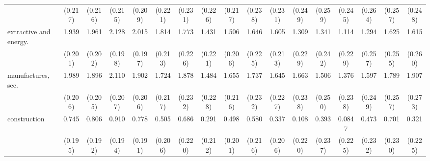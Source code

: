 {\begin{tabular}{l*{16}{c}}
                    &     (0.217)         &     (0.216)         &     (0.215)         &     (0.209)         &     (0.221)         &     (0.231)         &     (0.226)         &     (0.217)         &     (0.238)         &     (0.231)         &     (0.249)         &     (0.259)         &     (0.245)         &     (0.264)         &     (0.257)         &     (0.248)         \\
[1em]
extractive and energy.&       1.939\sym{***}&       1.961\sym{***}&       2.128\sym{***}&       2.015\sym{***}&       1.814\sym{***}&       1.773\sym{***}&       1.431\sym{***}&       1.506\sym{***}&       1.646\sym{***}&       1.605\sym{***}&       1.309\sym{***}&       1.341\sym{***}&       1.114\sym{***}&       1.294\sym{***}&       1.625\sym{***}&       1.615\sym{***}\\
                    &     (0.201)         &     (0.202)         &     (0.198)         &     (0.197)         &     (0.213)         &     (0.226)         &     (0.221)         &     (0.206)         &     (0.225)         &     (0.213)         &     (0.229)         &     (0.242)         &     (0.229)         &     (0.257)         &     (0.255)         &     (0.260)         \\
[1em]
manufactures, sec.  &       1.989\sym{***}&       1.896\sym{***}&       2.110\sym{***}&       1.902\sym{***}&       1.724\sym{***}&       1.878\sym{***}&       1.484\sym{***}&       1.655\sym{***}&       1.737\sym{***}&       1.645\sym{***}&       1.663\sym{***}&       1.506\sym{***}&       1.376\sym{***}&       1.597\sym{***}&       1.789\sym{***}&       1.907\sym{***}\\
                    &     (0.206)         &     (0.205)         &     (0.207)         &     (0.206)         &     (0.217)         &     (0.232)         &     (0.228)         &     (0.216)         &     (0.232)         &     (0.227)         &     (0.238)         &     (0.250)         &     (0.238)         &     (0.249)         &     (0.257)         &     (0.273)         \\
[1em]
construction        &       0.745\sym{***}&       0.806\sym{***}&       0.910\sym{***}&       0.778\sym{***}&       0.505\sym{*}  &       0.686\sym{**} &       0.291         &       0.498\sym{*}  &       0.580\sym{**} &       0.337         &       0.108         &       0.393         &      0.0847         &       0.473\sym{*}  &       0.701\sym{**} &       0.321         \\
                    &     (0.195)         &     (0.192)         &     (0.194)         &     (0.191)         &     (0.206)         &     (0.220)         &     (0.212)         &     (0.201)         &     (0.216)         &     (0.206)         &     (0.220)         &     (0.237)         &     (0.225)         &     (0.232)         &     (0.230)         &     (0.225)         \\

\end{tabular}}
